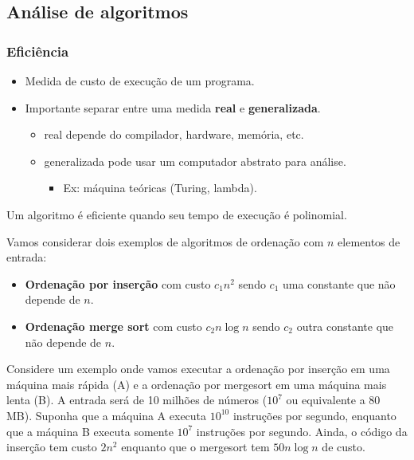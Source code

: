 \subsection{Análise de algoritmos}

\subsubsection{Eficiência}

\begin{itemize}
\item Medida de custo de execução de um programa.
\item Importante separar entre uma medida {\bf real}  e {\bf generalizada}.
	\begin{itemize}
	\item real depende do compilador, hardware, memória, etc.
	\item generalizada pode usar um computador abstrato para análise.
		\begin{itemize}
		\item Ex: máquina teóricas (Turing, lambda).
		\end{itemize}
	\end{itemize}
\end{itemize}

\begin{framed}
\centering
Um algoritmo é eficiente quando seu tempo de execução é polinomial.
\end{framed}

Vamos considerar dois exemplos de algoritmos de ordenação com $n$ elementos de entrada:
\begin{itemize}
\item {\bf Ordenação por inserção} com custo $c_1 n^2$ sendo $c_1$ uma constante que não depende de $n$.
\item {\bf Ordenação merge sort} com custo $c_2 n \log n$ sendo $c_2$ outra constante que não depende de $n$.
\end{itemize}

Considere um exemplo onde vamos executar a ordenação por inserção em uma máquina mais rápida (A)
e a ordenação por mergesort em uma máquina mais lenta (B).
A entrada será de 10 milhões de números ($10^7$ ou equivalente a $80$ MB).
Suponha que a máquina A executa $10^10$ instruções por segundo, enquanto que a máquina B executa
somente $10^7$ instruções por segundo. 
Ainda, o código da inserção tem custo $2n^2$ enquanto que o mergesort tem $50n \log n$ de custo.

